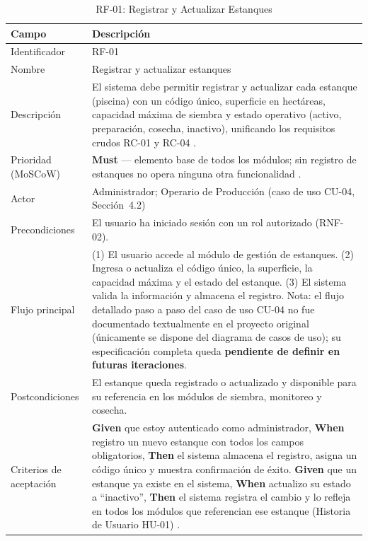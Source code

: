 \documentclass[12pt,a4paper]{article}
\begin{document}
\begin{table}[H]
\centering
\caption{RF-01: Registrar y Actualizar Estanques}
\begin{tabular}{|p{3.6cm}|p{10.4cm}|}
\hline
\textbf{Campo} & \textbf{Descripción} \\
\hline
Identificador & RF-01 \\ \hline
Nombre & Registrar y actualizar estanques \\ \hline
Descripción & El sistema debe permitir registrar y actualizar cada estanque
(piscina) con un código único, superficie en hectáreas, capacidad máxima de
siembra y estado operativo (activo, preparación, cosecha, inactivo), unificando
los requisitos crudos RC-01 y RC-04 \cite{ISO29148:2018}. \\ \hline
Prioridad (MoSCoW) & \textbf{Must} --- elemento base de todos los módulos; sin
registro de estanques no opera ninguna otra funcionalidad \cite{Kravchenko2022}. \\ \hline
Actor & Administrador; Operario de Producción (caso de uso CU-04, Sección~4.2) \\ \hline
Precondiciones & El usuario ha iniciado sesión con un rol autorizado
(RNF-02). \\ \hline
Flujo principal & (1) El usuario accede al módulo de gestión de estanques.
(2) Ingresa o actualiza el código único, la superficie, la capacidad máxima y
el estado del estanque. (3) El sistema valida la información y almacena el
registro. Nota: el flujo detallado paso a paso del caso de uso CU-04 no fue
documentado textualmente en el proyecto original (únicamente se dispone del
diagrama de casos de uso); su especificación completa queda \textbf{pendiente
de definir en futuras iteraciones}. \\ \hline
Postcondiciones & El estanque queda registrado o actualizado y disponible para
su referencia en los módulos de siembra, monitoreo y cosecha. \\ \hline
Criterios de aceptación &
\textbf{Given} que estoy autenticado como administrador,
\textbf{When} registro un nuevo estanque con todos los campos obligatorios,
\textbf{Then} el sistema almacena el registro, asigna un código único y
muestra confirmación de éxito.
\textbf{Given} que un estanque ya existe en el sistema,
\textbf{When} actualizo su estado a ``inactivo'',
\textbf{Then} el sistema registra el cambio y lo refleja en todos los módulos
que referencian ese estanque (Historia de Usuario HU-01) \cite{Cohn2004}. \\ \hline
\end{tabular}
\end{table}
\end{document}
